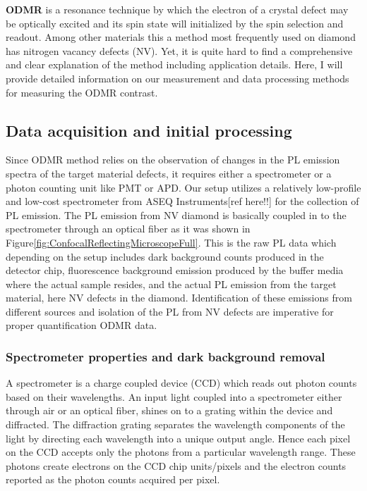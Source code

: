 \textbf{ODMR} is a resonance technique by which the electron of a crystal 
defect may be optically excited and its spin state will initialized by the 
spin selection and readout. Among other materials this a method most 
frequently used on diamond has nitrogen vacancy defects (NV). Yet, it is
quite hard to find a comprehensive and clear explanation of the method 
including application details. Here, I will provide detailed information on
our measurement and data processing methods for measuring the ODMR contrast.

\subsection{Data acquisition and initial processing}\label{subsec:dataAcquisition}
Since ODMR method relies on the observation of changes in the PL emission 
spectra of the target material defects, it requires either a spectrometer 
or a photon counting unit like PMT or APD. Our setup utilizes a relatively 
low-profile and low-cost spectrometer from ASEQ Instruments[ref here!!] for
the collection of PL emission. The PL emission from NV diamond is basically  
coupled in to the spectrometer through an optical fiber as it was shown in 
Figure\ref{fig:ConfocalReflectingMicroscopeFull}. This is the raw PL data 
which depending on the setup includes dark background counts produced in the
detector chip, fluorescence background emission produced by the buffer media
where the actual sample resides, and the actual PL emission from the target
material, here NV defects in the diamond. Identification of these emissions 
from different sources and isolation of the PL from NV defects are imperative
for proper quantification ODMR data.

\subsubsection{Spectrometer properties and dark background removal}\label{subsubsec:darkBGMethod}
A spectrometer is a charge coupled device (CCD) which reads out 
photon counts based on their wavelengths. An input light coupled into a
spectrometer either through air or an optical fiber, shines on to a grating 
within the device and diffracted. The diffraction grating separates the 
wavelength components of the light by directing each wavelength into a unique 
output angle. Hence each pixel on the CCD accepts only the photons from a 
particular wavelength range. These photons create electrons on the CCD chip 
units/pixels and the electron counts reported as the photon counts acquired 
per pixel. 

